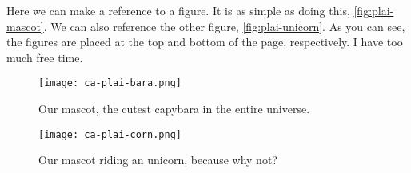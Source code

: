 Here we can make a reference to a figure.
It is as simple as doing this, \autoref{fig:plai-mascot}.
We can also reference the other figure, \autoref{fig:plai-unicorn}.
As you can see, the figures are placed at the top and bottom of the page, respectively.
I have too much free time.

\lipsum[1-5]

\begin{figure}[t]
    \begin{center}
        \texttt{[image: ca-plai-bara.png]}
    \end{center}
    \caption{Our mascot, the cutest capybara in the entire universe.}
    \label{fig:plai-mascot}
\end{figure}

\begin{figure}[b]
    \begin{center}
        \texttt{[image: ca-plai-corn.png]}
    \end{center}
    \caption{Our mascot riding an unicorn, because why not?}
    \label{fig:plai-unicorn}
\end{figure}
